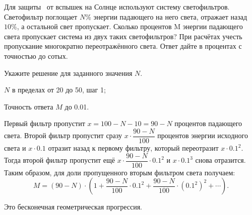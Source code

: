 
Для защиты  от
вспышек на Солнце используют систему светофильтров. Светофильтр поглощает $N \%$ энергии падающего на 
него света, отражает назад $10 \%$, а остальной
свет пропускает. Сколько процентов M энергии
падающего света пропускает система из двух таких светофильтров? При расчётах
учесть пропускание многократно переотражённого света. Ответ дайте в процентах с точностью до сотых.

Укажите решение для заданного значения $N$.

\paramSection

$N$ в пределах от 20 до 50, шаг 1;         

Точность ответа $M$ до  0.01.

\soultionSection

Первый фильтр пропустит $x = 100 - N - 10 = 90 - N$ процентов падающего света. Второй фильтр пропустит сразу  
$x \cdot \dfrac{90-N}{100}$ процентов энергии исходного света и  $x \cdot 0.1$ отразит назад к первому фильтру, 
который переотразит  $x \cdot 0.1^2$. Тогда второй фильтр пропустит ещё $x \cdot \dfrac{90-N}{100} \cdot 0.1^2$ и 
$x \cdot 0.1^3$ снова отразится. Таким образом, для доли пропущенного вторым фильтром света получаем:
$$M=(90-N) \cdot (1+\dfrac{90-N}{100} \cdot 0.1^2+\dfrac{90-N}{100} \cdot (0.1^2 )^2+ \cdots) .$$

Это бесконечная геометрическая прогрессия.


